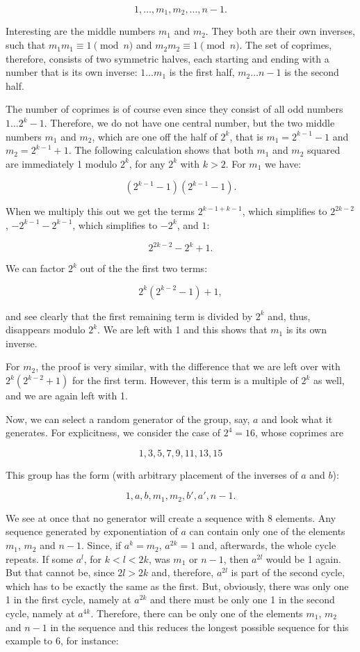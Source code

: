 \documentclass[tikz]{scrreprt}
\begin{document}
\[
1, \dots, m_1, m_2, \dots, n-1.
\]

Interesting are the middle numbers $m_1$ and $m_2$.
They both are their own inverses, such that
$m_1m_1 \equiv 1 \pmod{n}$ and
$m_2m_2 \equiv 1 \pmod{n}$.
The set of coprimes, therefore, consists of two symmetric halves,
each starting and ending with a number that is its own inverse:
$1\dots m_1$ is the first half,
$m_2\dots n-1$ is the second half.

The number of coprimes is of course even 
since they consist of all odd numbers
$1\dots 2^k-1$. Therefore, we do not have one central number,
but the two middle numbers $m_1$ and $m_2$, which are one off
the half of $2^k$, that is
$m_1 = 2^{k-1}-1$ and
$m_2 = 2^{k-1}+1$.
The following calculation shows that 
both $m_1$ and $m_2$ squared
are immediately 1 modulo $2^k$,
for any $2^k$ with $k>2$.
For $m_1$ we have:

\[
(2^{k-1}-1)(2^{k-1}-1).
\]

When we multiply this out we get the terms
$2^{k-1+k-1}$, which simplifies to $2^{2k-2}$,
$-2^{k-1}-2^{k-1}$, which simplifies to $-2^k$,
and $1$:

\[
2^{2k-2}-2^k+1.
\]

We can factor $2^k$ out of the the first two terms:

\[
2^k(2^{k-2}-1)+1,
\]

and see clearly that the first remaining term 
is divided by $2^k$ and, thus,
disappears modulo $2^k$. We are left with 1 and this shows
that $m_1$ is its own inverse.

For $m_2$, the proof is very similar, with the difference
that we are left over with $2^k(2^{k-2}+1)$ for the first term.
However, this term is a multiple of $2^k$ as well, and we are
again left with 1.

Now, we can select a random generator of the group, say, $a$
and look what it generates. For explicitness, we consider
the case of $2^4 = 16$, whose coprimes are

\[
1,3,5,7,9,11,13,15
\]

This group has the form 
(with arbitrary placement of the inverses of $a$ and $b$):

\[
1,a,b,m_1,m_2,b',a',n-1.
\]

We see at once that no generator will create a sequence
with 8 elements. Any sequence generated by exponentiation
of $a$ can contain only one of the elements $m_1$, $m_2$ and
$n-1$. Since, if $a^k = m_2$, $a^{2k} = 1$ and, afterwards,
the whole cycle repeats. If some $a^l$, for $k < l < 2k$,
was $m_1$ or $n-1$, then $a^{2l}$ would be 1 again.
But that cannot be, since $2l > 2k$ and, therefore,
$a^{2l}$ is part of the second cycle, which has to be
exactly the same as the first. But, obviously,
there was only one 1 in the first cycle, namely at $a^{2k}$
and there must be only one 1 in the second cycle, namely at
$a^{4k}$. Therefore, there can be only one of the elements
$m_1$, $m_2$ and $n-1$ in the sequence and this reduces
the longest possible sequence for this example to 6, for instance:
\end{document}
